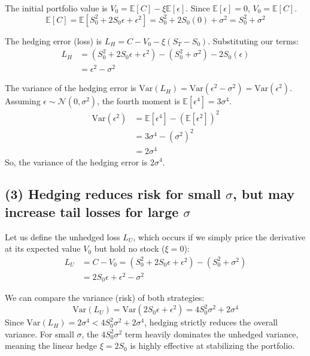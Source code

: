 The initial portfolio value is $V_0 = \mathbb{E}[C] - \xi\mathbb{E}[\epsilon]$. Since $\mathbb{E}[\epsilon] = 0$, $V_0 = \mathbb{E}[C]$.
\begin{equation*}
\mathbb{E}[C] = \mathbb{E}[S_0^2 + 2S_0\epsilon + \epsilon^2] = S_0^2 + 2S_0(0) + \sigma^2 = S_0^2 + \sigma^2
\end{equation*}

The hedging error (loss) is $L_H = C - V_0 - \xi(S_T - S_0)$. Substituting our terms:
\begin{align*}
L_H &= (S_0^2 + 2S_0\epsilon + \epsilon^2) - (S_0^2 + \sigma^2) - 2S_0(\epsilon) \\
&= \epsilon^2 - \sigma^2
\end{align*}

The variance of the hedging error is $\text{Var}(L_H) = \text{Var}(\epsilon^2 - \sigma^2) = \text{Var}(\epsilon^2)$.
Assuming $\epsilon \sim \mathcal{N}(0, \sigma^2)$, the fourth moment is $\mathbb{E}[\epsilon^4] = 3\sigma^4$.
\begin{align*}
\text{Var}(\epsilon^2) &= \mathbb{E}[\epsilon^4] - (\mathbb{E}[\epsilon^2])^2 \\
&= 3\sigma^4 - (\sigma^2)^2 \\
&= 2\sigma^4
\end{align*}
So, the variance of the hedging error is $2\sigma^4$.


\subsection*{(3) Hedging reduces risk for small $\sigma$, but may increase tail losses for large $\sigma$}

Let us define the unhedged loss $L_U$, which occurs if we simply price the derivative at its expected value $V_0$ but hold no stock ($\xi = 0$):
\begin{align*}
L_U &= C - V_0 = (S_0^2 + 2S_0\epsilon + \epsilon^2) - (S_0^2 + \sigma^2) \\
&= 2S_0\epsilon + \epsilon^2 - \sigma^2
\end{align*}

We can compare the variance (risk) of both strategies:
\begin{equation*}
\text{Var}(L_U) = \text{Var}(2S_0\epsilon + \epsilon^2) = 4S_0^2\sigma^2 + 2\sigma^4
\end{equation*}
Since $\text{Var}(L_H) = 2\sigma^4 < 4S_0^2\sigma^2 + 2\sigma^4$, hedging strictly reduces the overall variance. For small $\sigma$, the $4S_0^2\sigma^2$ term heavily dominates the unhedged variance, meaning the linear hedge $\xi = 2S_0$ is highly effective at stabilizing the portfolio.

